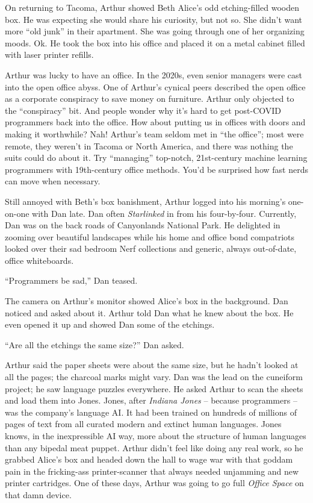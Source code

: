 On returning to Tacoma, Arthur showed Beth Alice's odd etching-filled
wooden box. He was expecting she would share his curiosity, but not so.
She didn't want more ``old junk'' in their apartment. She was going
through one of her organizing moods. Ok. He took the box into his office
and placed it on a metal cabinet filled with laser printer refills.

Arthur was lucky to have an office. In the 2020s, even senior managers
were cast into the open office abyss. One of Arthur's cynical peers
described the open office as a corporate conspiracy to save money on
furniture. Arthur only objected to the ``conspiracy'' bit. And people
wonder why it's hard to get post-COVID programmers back into the office.
How about putting us in offices with doors and making it worthwhile?
Nah! Arthur's team seldom met in ``the office''; most were remote, they
weren't in Tacoma or North America, and there was nothing the suits
could do about it. Try ``managing'' top-notch, 21st-century machine
learning programmers with 19th-century office methods. You'd be
surprised how fast nerds can move when necessary.

Still annoyed with Beth's box banishment, Arthur logged into his
morning's one-on-one with Dan late. Dan often \emph{Starlinked} in from
his four-by-four. Currently, Dan was on the back roads of Canyonlands
National Park. He delighted in zooming over beautiful landscapes while
his home and office bond compatriots looked over their sad bedroom Nerf
collections and generic, always out-of-date, office whiteboards.

``Programmers be sad,'' Dan teased.

The camera on Arthur's monitor showed Alice's box in the background. Dan
noticed and asked about it. Arthur told Dan what he knew about the box.
He even opened it up and showed Dan some of the etchings.

``Are all the etchings the same size?'' Dan asked.

Arthur said the paper sheets were about the same size, but he hadn't
looked at all the pages; the charcoal marks might vary. Dan was the lead
on the cuneiform project; he saw language puzzles everywhere. He asked
Arthur to scan the sheets and load them into Jones. Jones, after
\emph{Indiana Jones} -- because programmers -- was the company's
language AI. It had been trained on hundreds of millions of pages of
text from all curated modern and extinct human languages. Jones knows,
in the inexpressible AI way, more about the structure of human languages
than any bipedal meat puppet. Arthur didn't feel like doing any real
work, so he grabbed Alice's box and headed down the hall to wage war
with that goddam pain in the fricking-ass printer-scanner that always
needed unjamming and new printer cartridges. One of these days, Arthur
was going to go full \emph{Office Space} on that damn device.

